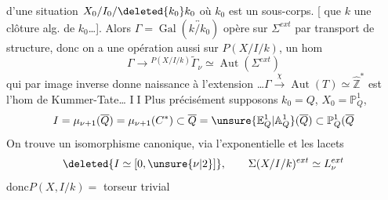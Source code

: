  d'une situation $X_0/I_0/\deleted{k_0}k_0$
où $k_0$ est un sous-corps. [  que
$k$  une clôture alg. de $k_0$\ldots].
Alors $\Gamma=\operatorname{Gal}(\overleftrightarrow{k/k_0})$ opère sur
$\Sigma^{ext}$ par transport de structure, donc on a
une  opération aussi sur $P(X/I/k)$,
  un hom
\[
\Gamma\longrightarrow {}^{P(X/I/k)}\widetilde\Gamma_\nu\simeq\operatorname{Aut}(\Sigma^{ext})
\]
qui par image inverse  donne naissance
à l'extension
\ldots\quad $\Gamma\xrightarrow{\chi}\operatorname{Aut}(T)\simeq\widehat{\mathbb Z}^{*}$ est l'hom de
Kummer-Tate\ldots
\textcircled{II} Plus précisément supposons $k_0=Q$, $X_0=\mathbb P^1_Q$,
\[
I=\mu_{\nu+1}(\overline Q)=\mu_{\nu+1}(C^*)\subset\overline Q=\unsure{\mathbb E^1_Q|\mathbb A^1_Q}(\overline Q)\subset\mathbb P^1_Q(\overline Q
\]
On trouve un isomorphisme canonique,
via l'exponentielle et les lacets
\[
\deleted{I\simeq[0,\unsure{\nu|2}]},
\qquad \Sigma(X/I/k)^{ext}\simeq L_\nu^{ext}
\]
donc\quad $P(X,I/k)=$ torseur trivial

